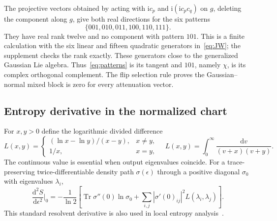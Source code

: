 \documentclass[11pt,a4paper]{article}
\newcommand{\Tr}{\operatorname{Tr}}
\newcommand{\dd}{\mathrm{d}}
\newcommand{\ii}{\mathrm{i}}
\begin{document}
The projective vectors obtained by acting with
$\ii c_p$ and $\ii(\ii c_pc_q)$ on $g$, deleting the component
along $g$, give both real directions for the six patterns
\begin{equation}
 \{001,010,011,100,110,111\}.\label{eq:patterns}
\end{equation}
They have real rank twelve and no component with pattern $101$.
This is a finite calculation with the six linear and fifteen quadratic
generators in~\eqref{eq:JW}; the supplement checks the rank exactly.
These generators close to the generalized Gaussian Lie algebra.
Thus~\eqref{eq:patterns} is its tangent and $101$, namely $\chi$,
is its complex orthogonal complement. The flip selection rule proves
the Gaussian--normal mixed block is zero for every attenuation vector.

\subsection{Entropy derivative in the normalized chart}
For $x,y>0$ define the logarithmic divided difference
\begin{equation}
 L(x,y)=\begin{cases}
 (\ln x-\ln y)/(x-y),&x\ne y,\\
 1/x,&x=y,
 \end{cases}
 \quad
 L(x,y)=\int_0^\infty\frac{\dd v}{(v+x)(v+y)}.
 \label{eq:L}
\end{equation}
The continuous value is essential when output eigenvalues coincide.
For a trace-preserving twice-differentiable density path $\sigma(\epsilon)$
through a positive diagonal $\sigma_0$ with eigenvalues $\lambda_i$,
\begin{equation}
 \frac{\dd^2S}{\dd\epsilon^2}\bigg|_0
 =-\frac1{\ln2}\left[
 \Tr\sigma''(0)\ln\sigma_0+
 \sum_{i,j}|\sigma'(0)_{ij}|^2 L(\lambda_i,\lambda_j)
 \right].\label{eq:entropyderivative}
\end{equation}
This standard resolvent derivative is also used in local
entropy analysis~\cite[Sec.~3]{RuskaiYard2023}.
\end{document}
